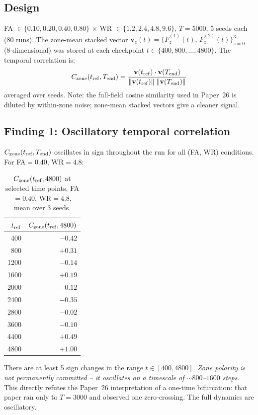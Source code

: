 \documentclass[11pt,a4paper]{article}
\begin{document}
\subsection{Design}

FA $\in \{0.10, 0.20, 0.40, 0.80\}$ $\times$ WR $\in \{1.2, 2.4, 4.8, 9.6\}$,
$T = 5000$, 5 seeds each (80 runs).  The zone-mean stacked vector
$\mathbf{v}_z(t) = \{\bar{F}_z^{(1)}(t),\,\bar{F}_z^{(2)}(t)\}_{z=0}^{3}$
(8-dimensional) was stored at each checkpoint $t \in \{400,800,\ldots,4800\}$.
The temporal correlation is:
\begin{equation}
  C_{\rm zone}(t_{\rm ref}, T_{\rm end}) =
  \frac{\mathbf{v}(t_{\rm ref}) \cdot \mathbf{v}(T_{\rm end})}
       {\|\mathbf{v}(t_{\rm ref})\|\;\|\mathbf{v}(T_{\rm end})\|}
\end{equation}
averaged over seeds.  Note: the full-field cosine similarity used in Paper~26
is diluted by within-zone noise; zone-mean stacked vectors give a cleaner signal.

\subsection{Finding 1: Oscillatory temporal correlation}

$C_{\rm zone}(t_{\rm ref}, T_{\rm end})$ oscillates in sign throughout the run
for all (FA, WR) conditions.  For FA$=0.40$, WR$=4.8$:

\begin{table}[h]
\centering
\caption{$C_{\rm zone}(t_{\rm ref}, 4800)$ at selected time points,
         FA$=0.40$, WR$=4.8$, mean over 3 seeds.}
\label{tab:C_vals}
\begin{tabular}{rr}
\toprule
$t_{\rm ref}$ & $C_{\rm zone}(t_{\rm ref}, 4800)$ \\
\midrule
 400  & $-0.42$ \\
 800  & $+0.31$ \\
1200  & $-0.14$ \\
1600  & $+0.19$ \\
2000  & $-0.12$ \\
2400  & $-0.35$ \\
2800  & $-0.02$ \\
3600  & $-0.10$ \\
4400  & $+0.49$ \\
4800  & $+1.00$ \\
\bottomrule
\end{tabular}
\end{table}

There are at least 5 sign changes in the range $t \in [400, 4800]$.
\emph{Zone polarity is not permanently committed -- it oscillates on a
timescale of $\sim 800$--$1600$ steps.}
This directly refutes the Paper~26 interpretation of a one-time bifurcation:
that paper ran only to $T=3000$ and observed one zero-crossing.  The full
dynamics are oscillatory.
\end{document}
